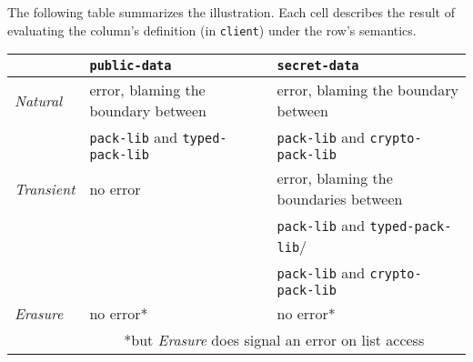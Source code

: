 The following table summarizes the illustration. Each cell describes the result
of evaluating the column's definition (in {\tt client}) under the row's
semantics.
\begin{center}
  \begin{tabular}{l|l@{\qquad}l}
                  & {\tt public-data}              & {\tt secret-data}                                 \\
\hline %
{\it Natural\/}   & error, blaming the boundary between & error, blaming the boundary between          \\
                  & {\tt pack-lib} and {\tt typed-pack-lib} & {\tt pack-lib} and {\tt crypto-pack-lib} \\
\hline
{\it Transient\/} & no error                       & error, blaming the boundaries between            \\
                  &                                & {\tt pack-lib}  and {\tt typed-pack-lib}/ \\
                  &                                & {\tt  pack-lib} and {\tt crypto-pack-lib}     \\
\hline
 {\it Erasure\/}   & no error*                      & no error*                                         \\
                  &   \multicolumn{2}{|c}{*but {\em Erasure} does signal an error on list access}
\end{tabular}
\end{center}


